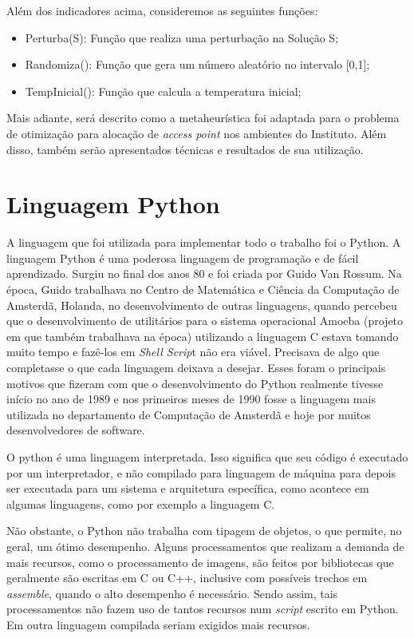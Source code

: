 \documentclass[
	12pt,				%
	openright,			%
	twoside,			%
	a4paper,			%
	english,			%
	french,				%
	spanish,			%
	brazil				%
	]{abntex2}
\begin{document}
Além dos indicadores acima, consideremos as seguintes funções:

\begin{itemize}
	\item Perturba(S): Função que realiza uma perturbação na Solução S;
	\item Randomiza(): Função que gera um número aleatório no intervalo [0,1];
	\item TempInicial(): Função que calcula a temperatura inicial;
	
\end{itemize}

Mais adiante, será descrito como a metaheurística foi adaptada para o problema de otimização para alocação de \textit{access point} nos ambientes do Instituto. Além disso, também serão apresentados técnicas e resultados de sua utilização. 

\section[Linguagem Python ]{Linguagem Python }

A linguagem que foi utilizada para implementar todo o trabalho foi o Python. A linguagem Python é uma poderosa linguagem de programação e de fácil aprendizado. Surgiu no final dos anos 80 e foi criada por Guido Van Rossum. Na época, Guido trabalhava no Centro de Matemática e Ciência da Computação de Amsterdã, Holanda,  no desenvolvimento de outras linguagens, quando percebeu que o desenvolvimento de utilitários para o sistema operacional Amoeba (projeto em que também trabalhava na época) utilizando a linguagem C estava tomando muito tempo e fazê-los em \textit{Shell Scrip}t não era viável. Precisava de algo que completasse o que cada linguagem deixava a desejar. Esses foram o principais motivos que fizeram com que o desenvolvimento do Python realmente tivesse início no ano de 1989 e nos primeiros meses de 1990 fosse a linguagem mais utilizada no departamento de Computação de Amsterdã e hoje por muitos desenvolvedores de software.

O python é uma linguagem interpretada. Isso significa que seu código é executado por um interpretador, e não compilado para linguagem de máquina para depois ser executada para um sistema e arquitetura específica, como acontece em algumas linguagens, como por exemplo a linguagem C. 

Não obstante, o Python não trabalha com tipagem de objetos, o que permite, no geral, um ótimo desempenho. Alguns processamentos que realizam a demanda de mais recursos, como o processamento de imagens, são feitos por bibliotecas que geralmente são escritas em C ou C++, inclusive com possíveis trechos em \textit{assemble}, quando o alto desempenho é necessário. Sendo assim, tais processamentos não fazem uso de tantos recursos num \textit{script} escrito em Python. Em outra linguagem compilada seriam exigidos mais recursos.
\end{document}
